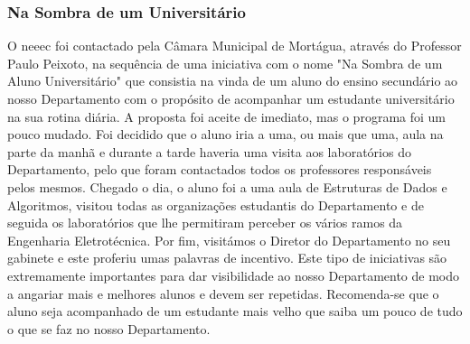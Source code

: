 
\subsubsection{Na Sombra de um Universitário}

O \acrshort{neeec} foi contactado pela Câmara Municipal de Mortágua, através do Professor Paulo Peixoto, na sequência de uma iniciativa com o nome "Na Sombra de um Aluno Universitário" que consistia na vinda de um aluno do ensino secundário ao nosso Departamento com o propósito de acompanhar um estudante universitário na sua rotina diária. A proposta foi aceite de imediato, mas o programa foi um pouco mudado. Foi decidido que o aluno iria a uma, ou mais que uma, aula na parte da manhã e durante a tarde haveria uma visita aos laboratórios do Departamento, pelo que foram contactados todos os professores responsáveis pelos mesmos. Chegado o dia, o aluno foi a uma aula de Estruturas de Dados e Algoritmos, visitou todas as organizações estudantis do Departamento e de seguida os laboratórios que lhe permitiram perceber os vários ramos da Engenharia Eletrotécnica. Por fim, visitámos o Diretor do Departamento no seu gabinete e este proferiu umas palavras de incentivo. Este tipo de iniciativas são extremamente importantes para dar visibilidade ao nosso Departamento de modo a angariar mais e melhores alunos e devem ser repetidas. Recomenda-se que o aluno seja acompanhado de um estudante mais velho que saiba um pouco de tudo o que se faz no nosso Departamento.